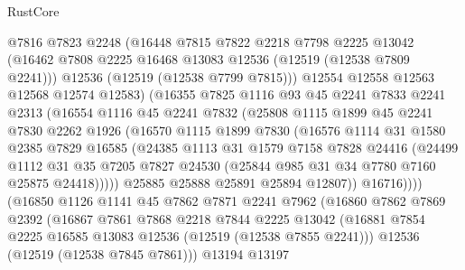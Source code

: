 \begin{lexlean}{RustCore}
\begin{coremodule}
                @7816
                @7823
                @2248
                (@16448
                  @7815
                  @7822
                  @2218
                  @7798
                  @2225
                  @13042
                  (@16462 @7808 @2225 @16468 @13083 @12536 (@12519 (@12538 @7809 @2241)))
                  @12536
                  (@12519 (@12538 @7799 @7815)))
                @12554
                @12558
                @12563
                @12568
                @12574
                @12583)
              (@16355
                @7825
                @1116
                @93
                @45
                @2241
                @7833
                @2241
                @2313
                (@16554
                  @1116
                  @45
                  @2241
                  @7832
                  (@25808
                    @1115
                    @1899
                    @45
                    @2241
                    @7830
                    @2262
                    @1926
                    (@16570
                      @1115
                      @1899
                      @7830
                      (@16576
                        @1114
                        @31
                        @1580
                        @2385
                        @7829
                        @16585
                        (@24385
                          @1113
                          @31
                          @1579
                          @7158
                          @7828
                          @24416
                          (@24499
                            @1112
                            @31
                            @35
                            @7205
                            @7827
                            @24530
                            (@25844 @985 @31 @34 @7780 @7160 @25875 @24418)))))
                    @25885
                    @25888
                    @25891
                    @25894
                    @12807))
                @16716))))
        (@16850
          @1126
          @1141
          @45
          @7862
          @7871
          @2241
          @7962
          (@16860
            @7862
            @7869
            @2392
            (@16867
              @7861
              @7868
              @2218
              @7844
              @2225
              @13042
              (@16881 @7854 @2225 @16585 @13083 @12536 (@12519 (@12538 @7855 @2241)))
              @12536
              (@12519 (@12538 @7845 @7861)))
            @13194
            @13197

\end{coremodule}
\end{lexlean}

